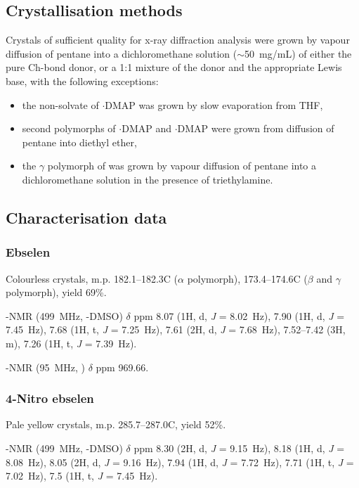 \begin{refsection}
\subsection{Crystallisation methods}
Crystals of sufficient quality for x-ray diffraction analysis were grown by vapour diffusion of pentane into a dichloromethane solution ($\sim$50~mg/mL) of either the pure Ch-bond donor, or a 1:1 mixture of the donor and the appropriate Lewis base, with the following exceptions:
\begin{itemize}
    \item the non-solvate of $ \cdot $DMAP was grown by slow evaporation from THF,
    \item second polymorphs of $ \cdot $DMAP and $ \cdot $DMAP were grown from diffusion of pentane into diethyl ether,
    \item the $\gamma$ polymorph of  was grown by vapour diffusion of pentane into a dichloro\-methane solution in the presence of triethylamine.
\end{itemize}

\subsection{Characterisation data}

\subsubsection{Ebselen }
Colourless crystals, m.p. 182.1--182.3\degree{}C ($\alpha$ polymorph), 173.4--174.6\degree{}C ($\beta$ and $\gamma$ polymorph), yield 69\%.\autocite{Bhabak2010}

-NMR (499~MHz, -DMSO) $ \delta $ ppm 8.07 (1H, d, \textit{J} = 8.02~Hz), 7.90 (1H, d, \textit{J} = 7.45~Hz), 7.68 (1H, t, \textit{J} = 7.25~Hz), 7.61 (2H, d, \textit{J} = 7.68~Hz), 7.52--7.42 (3H, m), 7.26 (1H, t, \textit{J} = 7.39~Hz).

-NMR (95~MHz, ) $ \delta $ ppm 969.66.

\subsubsection{4-Nitro ebselen }
Pale yellow crystals, m.p. 285.7--287.0\degree{}C, yield 52\%.\autocite{Pacua2014}

-NMR (499~MHz, -DMSO) $ \delta $ ppm 8.30 (2H, d, \textit{J} = 9.15~Hz), 8.18 (1H, d, \textit{J} = 8.08~Hz), 8.05 (2H, d, \textit{J} = 9.16~Hz), 7.94 (1H, d, \textit{J} = 7.72~Hz), 7.71 (1H, t, \textit{J} = 7.02~Hz), 7.5 (1H, t, \textit{J} = 7.45~Hz).


\end{refsection}
